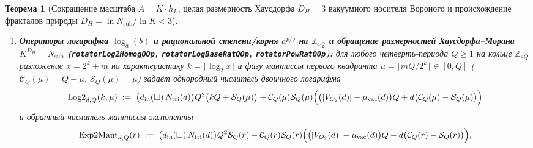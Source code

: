 \documentclass[11pt,a4paper]{article}
\theoremstyle{plain}
\newtheorem{theorem}{Теорема}[section]
\theoremstyle{definition}
\begin{document}
\begin{theorem}[Сокращение масштаба $A = K\cdot h_L$, целая размерность Хаусдорфа $D_H = 3$ вакуумного носителя Вороного и происхождение фракталов природы $D_H = \ln N_{\mathrm{sub}}/\ln K < 3$]
\begin{enumerate}[label=\textbf{(\arabic*)},leftmargin=*]
  \begin{itemize}[leftmargin=*]
  \item \emph{Октантная губка Серпинского--Поста в Канале~2 и 3-SAT ($K = 2$):} $N_{\mathrm{sub}} = 2^3 - 1 = 7 < 8 = 2^3$, что даёт $D_H = \ln 7/\ln 2 \approx 2{,}807355$;
  \item \emph{Кубооктаэдрическая губка $\mathcal{C}_{13}$ в кубе Мура $3\times 3\times 3$ ($K = d = 3$):} каузальность одного такта сохраняет $N_{\mathrm{sub}} = N_\varphi(3) = 13 < 27 = 3^3$ узлов, давая $D_H = \ln 13/\ln 3 \approx 2{,}334718$;
  \item \emph{Иерархическая кластеризация связанной материи на лестнице тонкой структуры ($K = \lfloor\alpha_{\mathrm{fs}}^{-1}\rfloor = 137$):} замкнутые оболочечные кластеры $N_{\mathrm{sub}}\in\{13, 42, 147\} \ll 137^3$ дают $D_H = \ln N_{\mathrm{sub}}/\ln 137 \in [0{,}522;\,0{,}999] < 3$;
  \item \emph{Фрактальные сосудистые и бронхиальные деревья живых организмов (\texttt{allometryExponentRatioOp}):} $4$-кратное ветвление по квадратной грани кубооктаэдра $k = d_{\mathrm{in}}(\square) = 4$ в $3$-мерном пространстве даёт показатель метаболической аллометрии Клейбера $(d_{\mathrm{in}}(\square)-\mu_{\mathrm{vac}})/d_{\mathrm{in}}(\square) = 3/4$.
  \end{itemize}
\item \textbf{Операторы логарифма $\log_a(b)$ и рациональной степени/корня $a^{p/q}$ на $\mathbb{Z}_{4Q}$ и обращение размерностей Хаусдорфа--Морана $K^{D_H} = N_{\mathrm{sub}}$ (\texttt{rotatorLog2HomogQOp}, \texttt{rotatorLogBaseRatQOp}, \texttt{rotatorPowRatQOp}):}
  для любого четверть-периода $Q\ge 1$ на кольце $\mathbb{Z}_{4Q}$ разложение $x = 2^k + m$ на характеристику $k = \lfloor\log_2 x\rfloor$ и фазу мантиссы первого квадранта $\mu = \lfloor m Q/2^k\rfloor\in[0,Q]$ ($\mathcal{C}_Q(\mu)=Q-\mu$, $\mathcal{S}_Q(\mu)=\mu$) задаёт однородный числитель двоичного логарифма
  \begin{equation}
    \label{eq:log2-homog-q}
    \operatorname{Log2}_{d,Q}(k,\mu) \;:=\; \bigl(d_{\mathrm{in}}(\square)\,N_{\mathrm{tri}}(d)\bigr)Q^2\bigl(k Q + \mathcal{S}_Q(\mu)\bigr) + \mathcal{C}_Q(\mu)\mathcal{S}_Q(\mu)\Bigl(\bigl(|V_{O_2}(d)|-\mu_{\mathrm{vac}}(d)\bigr)Q + d\bigl(\mathcal{C}_Q(\mu)-\mathcal{S}_Q(\mu)\bigr)\Bigr)
  \end{equation}
  и обратный числитель мантиссы экспоненты
  \begin{equation}
    \label{eq:exp2-homog-q}
    \operatorname{Exp2Mant}_{d,Q}(r) \;:=\; \bigl(d_{\mathrm{in}}(\square)\,N_{\mathrm{tri}}(d)\bigr)Q^2\mathcal{S}_Q(r) - \mathcal{C}_Q(r)\mathcal{S}_Q(r)\Bigl(\bigl(|V_{O_2}(d)|-\mu_{\mathrm{vac}}(d)\bigr)Q - d\bigl(\mathcal{C}_Q(r)-\mathcal{S}_Q(r)\bigr)\Bigr),

\end{equation}
\end{enumerate}
\end{theorem}
\end{document}
